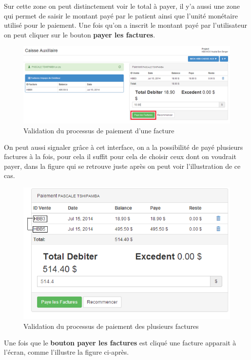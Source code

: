 \documentclass[12pt,a4paper]{report}
\begin{document}
Sur cette zone on peut distinctement voir le total à payer, il y'a aussi une zone qui permet de saisir le montant payé par le patient ainsi que l'unité monétaire utilisé pour  le paiement. Une fois qu'on a inscrit le montant payé par l'utilisateur on peut cliquer sur le bouton \textbf{payer les factures}.

\begin{figure}[h]
\begin{center}
\includegraphics[width=12cm]{pic/PaidInvoiceOK.png}
\end{center}
\caption{Validation du processus de paiement d'une facture}
\label{Validation du processus de paiement d'une facture}
\end{figure}
\newpage
On peut aussi signaler grâce à cet interface, on a la possibilité de payé plusieurs factures à la fois, pour cela il suffit pour cela de choisir ceux dont on voudrait payer, dans la figure qui se retrouve juste après on peut voir l'illustration de ce cas.

\begin{figure}[h]
\begin{center}
\includegraphics[width=12cm]{pic/PaidDoubleFact.png}
\end{center}
\caption{Validation du processus de paiement des plusieurs factures}
\label{Validation du processus de paiement des plusieurs factures}
\end{figure}
Une fois que le \textbf{bouton payer les factures} est cliqué une facture apparait à l'écran, comme l'illustre la figure ci-après.
\end{document}
